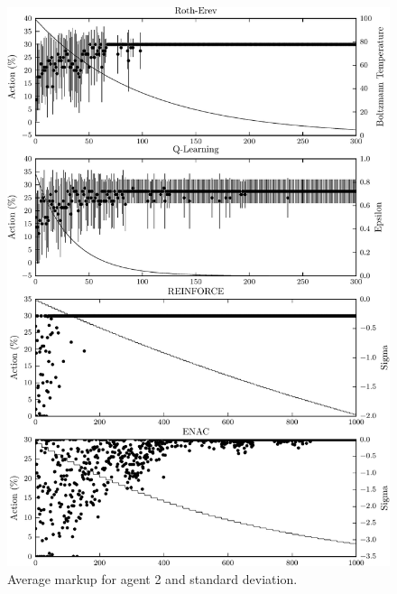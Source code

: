 \begin{figure}
  \centering
  \includegraphics{figures/fig5_2_action_a2}
  \caption{Average markup for agent 2 and standard deviation.}
  \label{fig:5_2_action_a2}
\end{figure}
